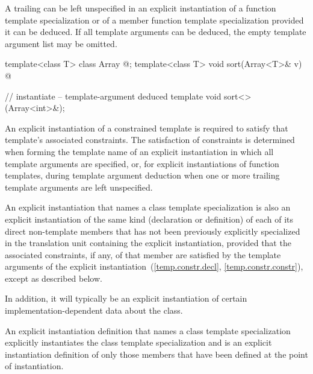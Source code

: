 \pnum
A trailing
can be left unspecified in an explicit instantiation of a function template
specialization or of a member function template specialization provided
it can be deduced.
If all template arguments can be deduced,
the empty template argument list \tcode{<>} may be omitted.
\begin{example}
\begin{codeblock}
template<class T> class Array { @\commentellip@ };
template<class T> void sort(Array<T>& v) { @\commentellip@ }

// instantiate  -- template-argument deduced
template void sort<>(Array<int>&);
\end{codeblock}
\end{example}

\pnum
\begin{note}
An explicit instantiation of a constrained template is required
to satisfy that template's associated constraints.
The satisfaction of constraints is determined
when forming the template name of an explicit instantiation
in which all template arguments are specified,
or, for explicit instantiations of function templates,
during template argument deduction
when one or more trailing template arguments are left unspecified.
\end{note}

\pnum
An explicit instantiation that names a class
template specialization is also an explicit
instantiation of the same kind (declaration or definition) of each
of its direct non-template members
that has not been previously explicitly specialized in
the translation unit containing the explicit instantiation,
provided that the associated constraints, if any,
of that member are satisfied by the template arguments of the explicit
instantiation~(\ref{temp.constr.decl}, \ref{temp.constr.constr}),
except as described below.
\begin{note}
In addition, it will typically be an explicit instantiation of certain
%
implementation-dependent data about the class.
\end{note}

\pnum
An explicit instantiation definition that names a class template
specialization explicitly instantiates the class template specialization
and is an explicit instantiation definition of only those
members that have been defined at the point of instantiation.

